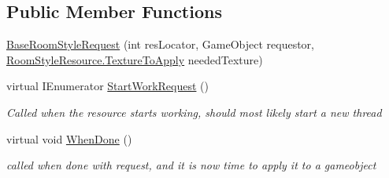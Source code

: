 \subsection*{Public Member Functions}
\begin{DoxyCompactItemize}
\item 
\mbox{\hyperlink{class_base_room_style_request_a7ac7b7ae86b8b63b1be428ad0cf8c6eb}{Base\+Room\+Style\+Request}} (int res\+Locator, Game\+Object requestor, \mbox{\hyperlink{class_room_style_resource_a877062d3830671f8376cc30340cdb45f}{Room\+Style\+Resource.\+Texture\+To\+Apply}} needed\+Texture)
\item 
virtual I\+Enumerator \mbox{\hyperlink{class_base_room_style_request_af2ac2de206ad154351cf6a1b1e7befd5}{Start\+Work\+Request}} ()
\begin{DoxyCompactList}\small\item\em Called when the resource starts working, should most likely start a new thread \end{DoxyCompactList}\item 
virtual void \mbox{\hyperlink{class_base_room_style_request_ad87356fc17614818e1713857f8901a2a}{When\+Done}} ()
\begin{DoxyCompactList}\small\item\em called when done with request, and it is now time to apply it to a gameobject \end{DoxyCompactList}\end{DoxyCompactItemize}
